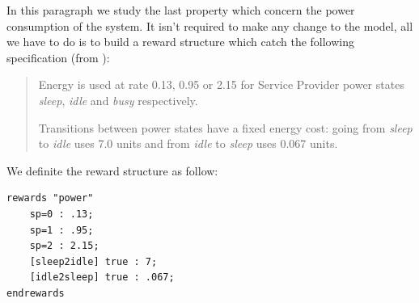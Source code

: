 In this paragraph we study the last property which concern the power
consumption of the system. It isn't required to make any change to the
model, all we have to do is to build a reward structure which catch
the following specification (from \cite{QWP99}):
\begin{quote}
  Energy is used at rate 0.13, 0.95 or 2.15 for Service Provider power
  states \emph{sleep}, \emph{idle} and \emph{busy} respectively.

  Transitions between power states have a fixed energy cost: going
  from \emph{sleep} to \emph{idle} uses 7.0 units and from \emph{idle}
  to \emph{sleep} uses 0.067 units.
\end{quote}
We definite the reward structure as follow:
\begin{verbatim}
rewards "power"
	sp=0 : .13;
	sp=1 : .95;
	sp=2 : 2.15;
	[sleep2idle] true : 7;
	[idle2sleep] true : .067;
endrewards
\end{verbatim}

